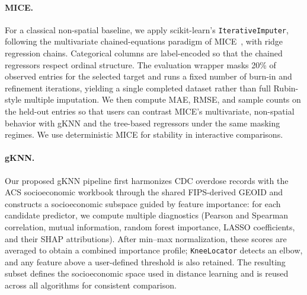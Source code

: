 \documentclass{egpubl}
\newcommand{\gknn}{gKNN\xspace}
\begin{document}
\paragraph*{MICE.}
For a classical non-spatial baseline, we apply scikit-learn's \texttt{IterativeImputer}, following the multivariate chained-equations paradigm of MICE~\cite{vanBuuren2011mice,VanBuuren2018MICE}, with ridge regression chains. Categorical columns are label-encoded so that the chained regressors respect ordinal structure. The evaluation wrapper masks 20\% of observed entries for the selected target and runs a fixed number of burn-in and refinement iterations, yielding a single completed dataset rather than full Rubin-style multiple imputation. We then compute MAE, RMSE, and sample counts on the held-out entries so that users can contrast MICE's multivariate, non-spatial behavior with \gknn{} and the tree-based regressors under the same masking regimes. We use deterministic MICE for stability in interactive comparisons.

\paragraph*{gKNN.}
Our proposed \gknn{} pipeline first harmonizes CDC overdose records with the ACS socioeconomic workbook through the shared FIPS-derived GEOID and constructs a socioeconomic subspace guided by feature importance: for each candidate predictor, we compute multiple diagnostics (Pearson and Spearman correlation, mutual information, random forest importance, LASSO coefficients, and their SHAP attributions). After min--max normalization, these scores are averaged to obtain a combined importance profile; \texttt{KneeLocator} detects an elbow, and any feature above a user-defined threshold is also retained. The resulting subset defines the socioeconomic space used in distance learning and is reused across all algorithms for consistent comparison.
\end{document}
